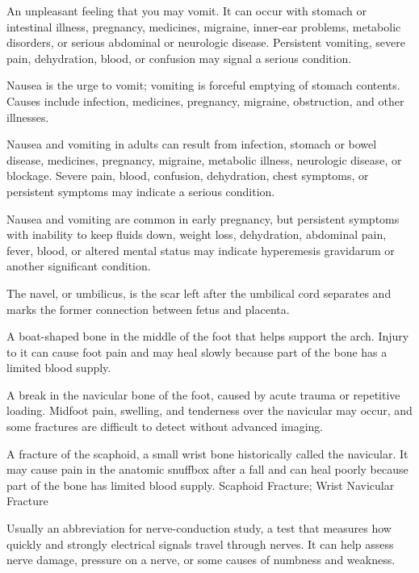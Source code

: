  An unpleasant feeling that you may vomit. It can occur with stomach or intestinal illness, pregnancy, medicines, migraine, inner-ear problems, metabolic disorders, or serious abdominal or neurologic disease. Persistent vomiting, severe pain, dehydration, blood, or confusion may signal a serious condition.

 Nausea is the urge to vomit; vomiting is forceful emptying of stomach contents. Causes include infection, medicines, pregnancy, migraine, obstruction, and other illnesses.

 Nausea and vomiting in adults can result from infection, stomach or bowel disease, medicines, pregnancy, migraine, metabolic illness, neurologic disease, or blockage. Severe pain, blood, confusion, dehydration, chest symptoms, or persistent symptoms may indicate a serious condition.

 Nausea and vomiting are common in early pregnancy, but persistent symptoms with inability to keep fluids down, weight loss, dehydration, abdominal pain, fever, blood, or altered mental status may indicate hyperemesis gravidarum or another significant condition.

 The navel, or umbilicus, is the scar left after the umbilical cord separates and marks the former connection between fetus and placenta.

 A boat-shaped bone in the middle of the foot that helps support the arch. Injury to it can cause foot pain and may heal slowly because part of the bone has a limited blood supply.

 A break in the navicular bone of the foot, caused by acute trauma or repetitive loading. Midfoot pain, swelling, and tenderness over the navicular may occur, and some fractures are difficult to detect without advanced imaging.

 A fracture of the scaphoid, a small wrist bone historically called the navicular. It may cause pain in the anatomic snuffbox after a fall and can heal poorly because part of the bone has limited blood supply.
\synonyms
Scaphoid Fracture; Wrist Navicular Fracture

 Usually an abbreviation for nerve-conduction study, a test that measures how quickly and strongly electrical signals travel through nerves. It can help assess nerve damage, pressure on a nerve, or some causes of numbness and weakness.

